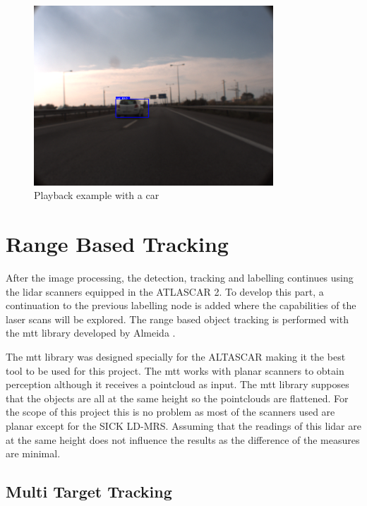 \begin{figure}[htp]
	
	\centering
	\includegraphics[width=0.8\textwidth]{caplabel/imgs/playback.png}
	
	\caption{Playback example with a car}
	\label{fig:playback}
	
\end{figure}

\section{Range Based Tracking}

After the image processing, the detection, tracking and labelling continues using the \gls{lidar} scanners equipped in the ATLASCAR 2. To develop this part, a continuation to the previous labelling node is added where the capabilities of the laser scans will be explored. The range based object tracking is performed with the \gls{mtt} library developed by Almeida \cite{SoaresDeAlmeida2016a}. 

The \gls{mtt} library was designed specially for the ALTASCAR making it the best tool to be used for this project. The \gls{mtt} works with planar scanners to obtain perception although it receives a pointcloud as input. The \gls{mtt} library supposes that the objects are all at the same height so the pointclouds are flattened. For the scope of this project this is no problem as most of the scanners used are planar except for the SICK LD-MRS. Assuming that the readings of this \gls{lidar} are at the same height does not influence the results as the difference of the measures are minimal. 

\subsection{Multi Target Tracking}

